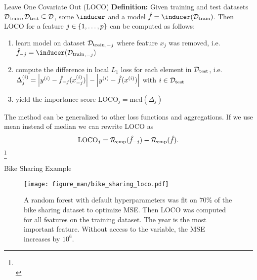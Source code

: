 \documentclass[11pt,compress,t,notes=noshow, aspectratio=169, xcolor=table]{beamer}
\begin{document}
\begin{vbframe}{Leave One Covariate Out (LOCO)}
%
\textbf{Definition:} Given training and test datasets $\mathcal{D}_{\text{train}}, \mathcal{D}_{\text{test}} \subseteq \mathcal{D}$, some $\inducer$ and a model $\fh = \inducer(\Dtrain)$. Then LOCO for a feature $j \in \{1, \ldots, p\}$ can be computed as follows:
  \begin{enumerate}
    \item learn model on dataset ${\mathcal{D}_{\text{train}}}_{,-j}$ where feature $x_j$ was removed, i.e. $\fh_{-j} = \inducer({\Dtrain}_{,-j})$
    \item compute the difference in local $L_1$ loss for each element in $\mathcal{D}_{\text{test}}$, i.e. $\Delta_j^{(i)} = \left  |y^{(i)} - \hat{f}_{-j}(x_{-j}^{(i)}) \right | - \left |y^{(i)} - \hat{f}(x^{(i)}) \right | $ with $i \in \mathcal{D}_{\text{test}}$
    \item yield the importance score $\text{LOCO}_j = \text{med} \left ( \Delta_j  \right )$
  \end{enumerate}
\lz 
The method can be generalized to other loss functions and aggregations. If we use mean instead of median we can rewrite LOCO as
%
$$ \text{LOCO}_j = \mathcal{R}_{\text{emp}}(\hat{f}_{-j}) - \mathcal{R}_{\text{emp}}(\hat{f}).$$
\footnote[frame]{\\ }
\end{vbframe}

\begin{vbframe}{Bike Sharing Example}
%
\begin{figure}
  \centering
  \texttt{[image: figure\_man/bike\_sharing\_loco.pdf]}
\caption{A random forest with default hyperparameters was fit on $70\%$ of the bike sharing dataset to optimize MSE. Then LOCO was computed for all features on the training dataset. The year is the most important feature. Without access to the variable, the MSE increases by $10^6$.}
\end{figure}
%
%
\end{vbframe}
\end{document}
